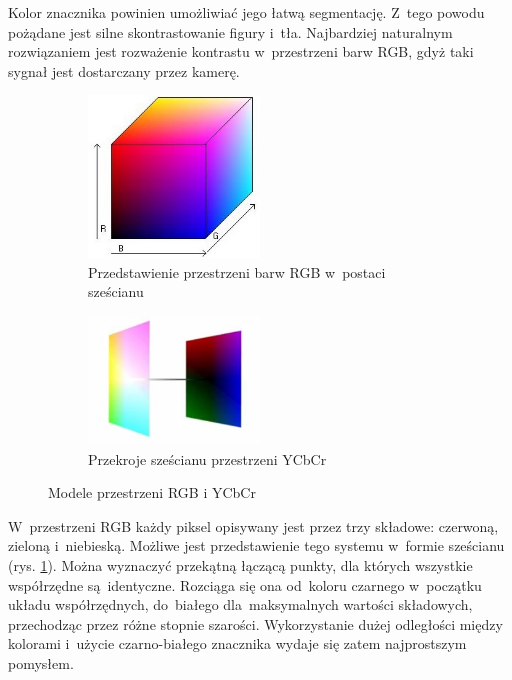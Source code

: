 Kolor znacznika powinien umożliwiać jego łatwą segmentację. 
Z~tego powodu pożądane jest silne skontrastowanie figury i~tła. 
Najbardziej naturalnym rozwiązaniem jest rozważenie kontrastu w~przestrzeni barw RGB, gdyż taki sygnał jest dostarczany przez kamerę.

\begin{figure}[h]
	\centering
	\begin{subfigure}{0.4\textwidth}
		\centering
		\includegraphics[width=0.5\textwidth]{szescian_rgb.jpg}
		\caption{Przedstawienie przestrzeni barw RGB w~postaci sześcianu \cite{obrazek_rgb}}
		\label{fig:szescian_rgb}
	\end{subfigure}%
	\begin{subfigure}{0.4\textwidth}
		\centering
		\includegraphics[width=0.5\textwidth]{szescian_ycbcr.jpg}
		\caption{Przekroje sześcianu przestrzeni YCbCr \cite{obrazek_ycbcr}}
		\label{fig:szescian_ycbcr}
	\end{subfigure}%
	\caption{Modele przestrzeni RGB i YCbCr}
	\label{fig:modele_przestrzeni}
\end{figure}

W~przestrzeni RGB każdy piksel opisywany jest przez trzy składowe: czerwoną, zieloną i~niebieską. 
Możliwe jest przedstawienie tego systemu w~formie sześcianu (rys. \ref{fig:szescian_rgb}). 
Można wyznaczyć przekątną łączącą punkty, dla których wszystkie współrzędne są~identyczne. 
Rozciąga się ona od~koloru czarnego w~początku układu współrzędnych, do~białego dla~maksymalnych wartości składowych, przechodząc przez różne stopnie szarości. 
Wykorzystanie dużej odległości między kolorami i~użycie czarno-białego znacznika wydaje się zatem najprostszym pomysłem.

